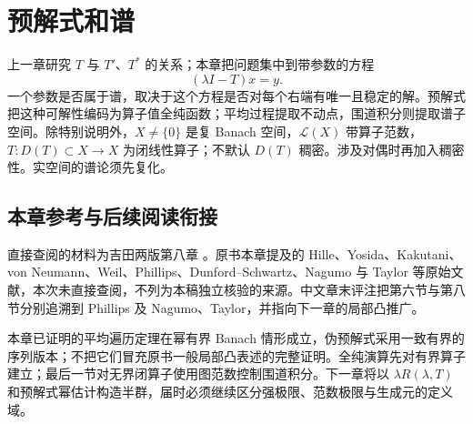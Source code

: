 \chapter{预解式和谱}\label{ch:yosida-08}

上一章研究 $T$ 与 $T'$、$T^*$ 的关系；本章把问题集中到带参数的方程
\[
 (\lambda I-T)x=y.
\]
一个参数是否属于谱，取决于这个方程是否对每个右端有唯一且稳定的解。预解式把这种可解性编码为算子值全纯函数；平均过程提取不动点，围道积分则提取谱子空间。除特别说明外，$X\ne\{0\}$ 是复 Banach 空间，$\mathcal L(X)$ 带算子范数，$T:D(T)\subset X\to X$ 为闭线性算子；不默认 $D(T)$ 稠密。涉及对偶时再加入稠密性。实空间的谱论须先复化。










\section*{本章参考与后续阅读衔接}
直接查阅的材料为吉田两版第八章 \cite{yosida-zh,yosida-en}。原书本章提及的 Hille、Yosida、Kakutani、von Neumann、Weil、Phillips、Dunford--Schwartz、Nagumo 与 Taylor 等原始文献，本次未直接查阅，不列为本稿独立核验的来源。中文章末评注把第六节与第八节分别追溯到 Phillips 及 Nagumo、Taylor，并指向下一章的局部凸推广。

本章已证明的平均遍历定理在幂有界 Banach 情形成立，伪预解式采用一致有界的序列版本；不把它们冒充原书一般局部凸表述的完整证明。全纯演算先对有界算子建立；最后一节对无界闭算子使用图范数控制围道积分。下一章将以 $\lambda R(\lambda,T)$ 和预解式幂估计构造半群，届时必须继续区分强极限、范数极限与生成元的定义域。

